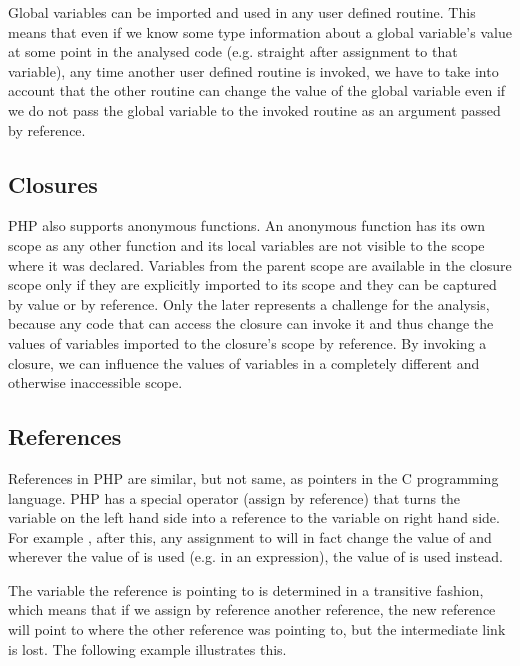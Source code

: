     Global variables can be imported and used in any user defined 
    routine. This means that even if we know some type information 
    about a global variable's value at some point in the analysed 
    code (e.g. straight after assignment to that variable), 
    any time another user defined routine is invoked, we 
    have to take into account that the other routine can 
    change the value of the global variable even if we do not 
    pass the global variable to the invoked routine 
    as an argument passed by reference.

    \subsection{Closures}
    PHP also supports anonymous functions. An anonymous function has its 
    own scope as any other function and its local variables are not visible 
    to the scope where it was declared. Variables from the parent 
    scope are available in the closure scope only if they are 
    explicitly imported to its scope and they can be captured 
    by value or by reference. Only the later represents a 
    challenge for the analysis, because any code that can 
    access the closure can invoke it and thus change the 
    values of variables imported to the closure's scope 
    by reference. By invoking a closure, we can influence 
    the values of variables in a completely different 
    and otherwise inaccessible scope.
    
    \subsection{References}
    References in PHP are similar, but not same, as pointers 
    in the C programming language. PHP has a special 
    operator \code{=\&} (assign by reference) that turns 
    the variable on the 
    left hand side into a reference to the 
    variable on right hand side. For example , 
    after this, any assignment 
    to  will in fact change the 
    value of  and wherever 
    the value of  is used (e.g. in an expression), 
    the value of  is used instead.
    
    The variable the reference is pointing to is determined 
    in a transitive fashion, which means that if we assign 
    by reference another reference, the new reference will 
    point to where the other reference was pointing to, 
    but the intermediate link is lost. The following example 
    illustrates this.
    
